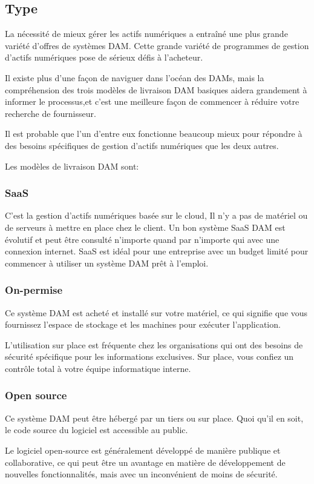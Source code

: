 \subsection{Type}{
La nécessité de mieux gérer les actifs numériques a entraîné une plus grande variété d'offres de systèmes DAM. Cette grande variété de programmes de gestion d'actifs numériques pose de sérieux défis à l'acheteur.
\newline

Il existe plus d'une façon de naviguer dans l'océan des DAMs, mais la compréhension des trois modèles de livraison DAM basiques aidera grandement à informer le processus,et c'est une meilleure façon de commencer à réduire votre recherche de fournisseur.

 Il est probable que l'un d'entre eux fonctionne beaucoup mieux pour répondre à des besoins spécifiques de gestion d'actifs numériques que les deux autres. 
 
 
Les modèles de livraison DAM sont:

\subsubsection{SaaS}{}
C’est la gestion d'actifs numériques basée sur le cloud, Il n'y a pas de matériel ou de serveurs à mettre en place chez le client.
Un bon système SaaS DAM est évolutif et peut être consulté n'importe quand par n'importe qui avec une connexion internet.
SaaS est idéal pour une entreprise avec un budget limité pour commencer à utiliser un système DAM prêt à l'emploi.

 \subsubsection{On-permise}{}
Ce système DAM est acheté et installé sur votre matériel, ce qui signifie que vous fournissez l'espace de stockage et les machines pour exécuter l'application.

L'utilisation sur place est fréquente chez les organisations qui ont des besoins de sécurité spécifique pour les informations exclusives. Sur place, vous confiez un contrôle total à votre équipe informatique interne.

  \subsubsection{Open source}{}
Ce système DAM peut être hébergé par un tiers ou sur place. Quoi qu'il en soit, le code source du logiciel est accessible au public.

 Le logiciel open-source est généralement développé de manière publique et collaborative, ce qui peut être un avantage en matière de développement de nouvelles fonctionnalités, mais avec un inconvénient de moins de sécurité.}

